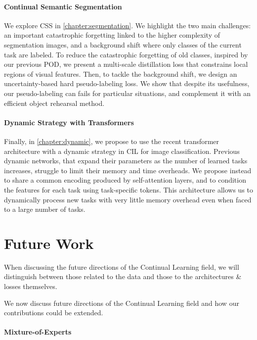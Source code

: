 \paragraph{Continual Semantic Segmentation} We explore \ac{CSS} in \autoref{chapter:segmentation}.
We highlight the two main challenges: an important catastrophic forgetting linked to the higher
complexity of segmentation images, and a background shift where only classes of the current task are
labeled. To reduce the catastrophic forgetting of old classes, inspired by our previous POD, we
present a multi-scale distillation loss that constrains local regions of visual features. Then, to
tackle the background shift, we design an uncertainty-based hard pseudo-labeling loss. We show that
despite its usefulness, our pseudo-labeling can fails for particular situations, and complement it
with an efficient object rehearsal method.

\paragraph{Dynamic Strategy with Transformers} Finally, in \autoref{chapter:dynamic}, we propose to
use the recent transformer architecture with a dynamic strategy in \acf{CIL} for image
classification. Previous dynamic networks, that expand their parameters as the number of learned
tasks increases, struggle to limit their memory and time overheads. We propose instead to share a
common encoding produced by self-attention layers, and to condition the features for each task using
task-specific tokens. This architecture allows us to dynamically process new tasks with very little
memory overhead even when faced to a large number of tasks.

\section{Future Work}

When discussing the future directions of the Continual Learning field, we will distinguish between
those related to the data and those to the architectures \& losses themselves.

We now discuss future directions of the Continual Learning field and how our contributions could be
extended.

\paragraph{Mixture-of-Experts}

